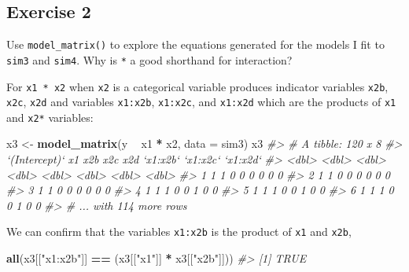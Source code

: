 \documentclass[]{book}
\newenvironment{Shaded}{\begin{snugshade}}{\end{snugshade}}
\newcommand{\CommentTok}[1]{\textcolor[rgb]{0.56,0.35,0.01}{\textit{#1}}}
\newcommand{\DataTypeTok}[1]{\textcolor[rgb]{0.13,0.29,0.53}{#1}}
\newcommand{\KeywordTok}[1]{\textcolor[rgb]{0.13,0.29,0.53}{\textbf{#1}}}
\newcommand{\NormalTok}[1]{#1}
\newcommand{\OperatorTok}[1]{\textcolor[rgb]{0.81,0.36,0.00}{\textbf{#1}}}
\newcommand{\StringTok}[1]{\textcolor[rgb]{0.31,0.60,0.02}{#1}}
\theoremstyle{plain}
\theoremstyle{remark}
\theoremstyle{definition}
\theoremstyle{definition}
\theoremstyle{definition}
\theoremstyle{remark}
\begin{document}
\hypertarget{exercise-2-62}{%
\subsection{Exercise 2}\label{exercise-2-62}}

Use \texttt{model\_matrix()} to explore the equations generated for the
models I fit to \texttt{sim3} and \texttt{sim4}. Why is \texttt{*} a
good shorthand for interaction?

For \texttt{x1\ *\ x2} when \texttt{x2} is a categorical variable
produces indicator variables \texttt{x2b}, \texttt{x2c}, \texttt{x2d}
and variables \texttt{x1:x2b}, \texttt{x1:x2c}, and \texttt{x1:x2d}
which are the products of \texttt{x1} and \texttt{x2*} variables:

\begin{Shaded}
\begin{Highlighting}[]
\NormalTok{x3 <-}\StringTok{ }\KeywordTok{model_matrix}\NormalTok{(y }\OperatorTok{~}\StringTok{ }\NormalTok{x1 }\OperatorTok{*}\StringTok{ }\NormalTok{x2, }\DataTypeTok{data =}\NormalTok{ sim3)}
\NormalTok{x3}
\CommentTok{#> # A tibble: 120 x 8}
\CommentTok{#>   `(Intercept)`    x1   x2b   x2c   x2d `x1:x2b` `x1:x2c` `x1:x2d`}
\CommentTok{#>           <dbl> <dbl> <dbl> <dbl> <dbl>    <dbl>    <dbl>    <dbl>}
\CommentTok{#> 1             1     1     0     0     0        0        0        0}
\CommentTok{#> 2             1     1     0     0     0        0        0        0}
\CommentTok{#> 3             1     1     0     0     0        0        0        0}
\CommentTok{#> 4             1     1     1     0     0        1        0        0}
\CommentTok{#> 5             1     1     1     0     0        1        0        0}
\CommentTok{#> 6             1     1     1     0     0        1        0        0}
\CommentTok{#> # ... with 114 more rows}
\end{Highlighting}
\end{Shaded}

We can confirm that the variables \texttt{x1:x2b} is the product of
\texttt{x1} and \texttt{x2b},

\begin{Shaded}
\begin{Highlighting}[]
\KeywordTok{all}\NormalTok{(x3[[}\StringTok{"x1:x2b"}\NormalTok{]] }\OperatorTok{==}\StringTok{ }\NormalTok{(x3[[}\StringTok{"x1"}\NormalTok{]] }\OperatorTok{*}\StringTok{ }\NormalTok{x3[[}\StringTok{"x2b"}\NormalTok{]]))}
\CommentTok{#> [1] TRUE}
\end{Highlighting}
\end{Shaded}
\end{document}
